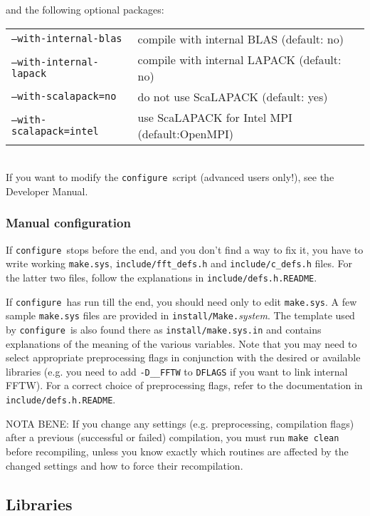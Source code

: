 \documentclass[12pt,a4paper]{article}
\def\configure{\texttt{configure}}
\begin{document}
and the following optional packages:\\
\begin{tabular}{ll}
\texttt{--with-internal-blas}&    compile with internal BLAS (default: no)\\
\texttt{--with-internal-lapack}&  compile with internal LAPACK (default: no)\\
\texttt{--with-scalapack=no}&     do not use ScaLAPACK (default: yes)\\
\texttt{--with-scalapack=intel}&  use ScaLAPACK for Intel MPI (default:OpenMPI)\\
\end{tabular}\\
If you want to modify the \configure\ script (advanced users only!), 
see the Developer Manual.

\subsubsection{Manual configuration}
\label{SubSec:manconf}
If \configure\ stops before the end, and you don't find a way to fix
it, you have to write working \texttt{make.sys}, \texttt{include/fft\_defs.h}
and \texttt{include/c\_defs.h} files. 
For the latter two files, follow the explanations in 
\texttt{include/defs.h.README}.

If \configure\ has run till the end, you should need only to
edit \texttt{make.sys}. A few sample \texttt{make.sys} files
are provided in \texttt{install/Make.}{\em system}. The template used 
by \configure\ is also found there as \texttt{install/make.sys.in} 
and contains explanations of the meaning
of the various variables. Note that you may need 
to select appropriate preprocessing flags
in conjunction with the desired or available
libraries (e.g. you need to add \texttt{-D\_\_FFTW} to \texttt{DFLAGS}
if you want to link internal FFTW). For a correct choice of preprocessing 
flags, refer to the documentation in \texttt{include/defs.h.README}.

NOTA BENE: If you change any settings (e.g. preprocessing,
compilation flags) 
after a previous (successful or failed) compilation, you must run 
\texttt{make clean} before recompiling, unless you know exactly which 
routines are affected by the changed settings and how to force their recompilation.

\subsection{Libraries}
\label{Sec:Libraries}
\end{document}
